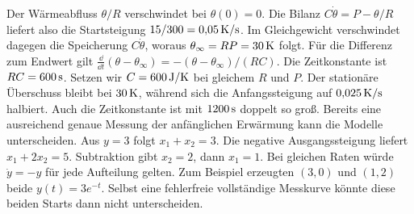 \schreibfeld



Der Wärmeabfluss \(\theta/R\) verschwindet bei \(\theta(0)=0\). Die Bilanz \(C\dot\theta=P-\theta/R\) liefert also die Startsteigung \(15/300=0{,}05\,\mathrm{K/s}\). Im Gleichgewicht verschwindet dagegen die Speicherung \(C\dot\theta\), woraus \(\theta_\infty=RP=30\,\mathrm{K}\) folgt. Für die Differenz zum Endwert gilt \(\frac{\dd}{\dd t}(\theta-\theta_\infty)=-(\theta-\theta_\infty)/(RC)\). Die Zeitkonstante ist \(RC=600\,\mathrm{s}\).
Setzen wir \(C=600\,\mathrm{J/K}\) bei gleichem \(R\) und \(P\). Der stationäre Überschuss bleibt bei \(30\,\mathrm{K}\), während sich die Anfangssteigung auf \(0{,}025\,\mathrm{K/s}\) halbiert. Auch die Zeitkonstante ist mit \(1200\,\mathrm{s}\) doppelt so groß. Bereits eine ausreichend genaue Messung der anfänglichen Erwärmung kann die Modelle unterscheiden.
Aus \(y=3\) folgt \(x_1+x_2=3\). Die negative Ausgangssteigung liefert \(x_1+2x_2=5\). Subtraktion gibt \(x_2=2\), dann \(x_1=1\). Bei gleichen Raten würde \(\dot y=-y\) für jede Aufteilung gelten. Zum Beispiel erzeugten \((3,0)\) und \((1,2)\) beide \(y(t)=3e^{-t}\). Selbst eine fehlerfreie vollständige Messkurve könnte diese beiden Starts dann nicht unterscheiden.


